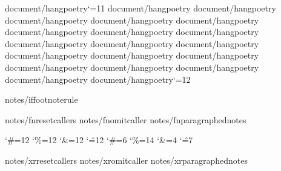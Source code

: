 {document/hangpoetry}\catcode`\@=11
{document/hangpoetry}
{document/hangpoetry}
{document/hangpoetry}
{document/hangpoetry}
{document/hangpoetry}
{document/hangpoetry}
{document/hangpoetry}
{document/hangpoetry}
{document/hangpoetry}
{document/hangpoetry}
{document/hangpoetry}
{document/hangpoetry}
{document/hangpoetry}
{document/hangpoetry}
{document/hangpoetry}
{document/hangpoetry}
{document/hangpoetry}
{document/hangpoetry}
{document/hangpoetry}\catcode`\@=12


{notes/iffootnoterule}\def\footnoterule{{}} 

{notes/fnresetcallers}
{notes/fnomitcaller}
{notes/fnparagraphednotes}

\catcode`\#=12 \catcode`\%=12 \catcode`\&=12 \catcode`\^=12
\catcode`\#=6 \catcode`\%=14 \catcode`\&=4 \catcode`\^=7
%

{notes/xrresetcallers}
{notes/xromitcaller}
{notes/xrparagraphednotes}

